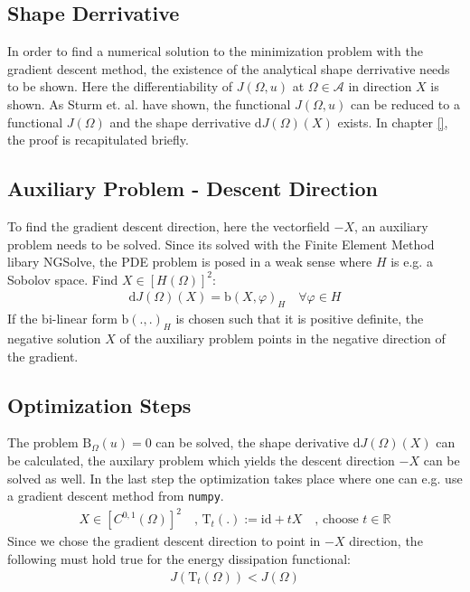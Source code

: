 \subsection*{Shape Derrivative}
In order to find a numerical solution to the minimization problem with the gradient descent
method, the existence of the analytical shape derrivative needs to be shown. Here the
differentiability of $J(\Omega,u)$ at $\Omega \in \mathcal{A}$ in direction $X$ is shown. 
As Sturm et. al. \cite{nearly_conformal_paper} have shown, the functional 
$J(\Omega, u)$ can be reduced to a functional $J(\Omega)$ and the shape derrivative 
$\mathrm{d}J(\Omega)(X)$ exists. In chapter \ref*{}, the proof is recapitulated briefly.

\pagebreak

\subsection*{Auxiliary Problem - Descent Direction}
To find the gradient descent direction, here the vectorfield $-X$, an auxiliary problem needs to be solved.
Since its solved with the Finite Element Method libary NGSolve, the PDE problem is posed in a weak sense where 
$H$ is e.g. a Sobolov space. Find $X \in [H(\Omega)]^2:$ 
\begin{align*}
    \mathrm{d}J(\Omega)(X) = \mathrm{b}(X,\varphi)_H \quad \forall  \varphi \in H
\end{align*}
If the bi-linear form $\mathrm{b}(.,.)_H$ is chosen such that it is positive definite, the negative solution $X$
of the auxiliary problem points in the negative direction of the gradient.

\subsection*{Optimization Steps}
The problem $\mathrm{B}_{\Omega}(u) = 0$ can be solved, the shape derivative $\mathrm{d}J(\Omega)(X)$ can be calculated, the auxilary problem which yields 
the descent direction $-X$ can be solved as well. In the last step the optimization takes place where one can e.g. use a gradient descent method
 from \texttt{numpy}.
 \begin{align*}
    X \in [C^{0,1}(\Omega)]^2 \quad , \, \mathrm{T}_t(.):= \mathrm{id} + tX \quad , \, \text{choose } t \in \mathbb{R}
\end{align*}
Since we chose the gradient descent direction to point in $-X$ direction, the following must hold true for the energy dissipation functional:
\begin{align*}
    J(\mathrm{T}_t(\Omega)) <J(\Omega)
\end{align*}
